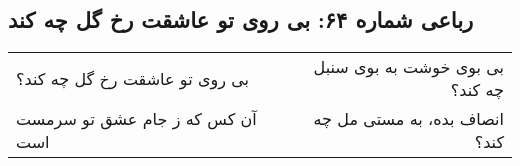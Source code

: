 \begin{center}
\section*{رباعی شماره ۶۴: بی روی تو عاشقت رخ گل چه کند}
\label{sec:064}
\begin{longtable}{l p{0.5cm} r}
بی روی تو عاشقت رخ گل چه کند؟
&&
بی بوی خوشت به بوی سنبل چه کند؟
\\
آن کس که ز جام عشق تو سرمست است
&&
انصاف بده، به مستی مل چه کند؟
\\
\end{longtable}
\end{center}
